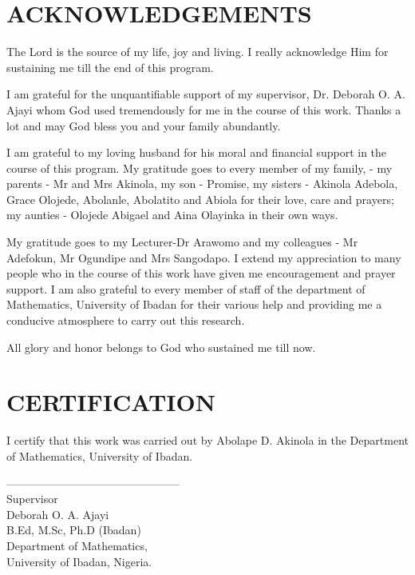 \documentclass[12pt]{report}
\begin{document}
\chapter*{ACKNOWLEDGEMENTS}
 The Lord is the
source of my life, joy and living. I really acknowledge Him for
sustaining me till the end of this program.

I am grateful for the unquantifiable support of my supervisor, Dr.
Deborah O. A. Ajayi whom God used tremendously for me in the course
of this work. Thanks a lot and may God bless you and your family
abundantly.

I am grateful to my loving husband for his moral and financial
support in the course of this program. My gratitude goes to every
member of my family, - my parents - Mr and Mrs Akinola, my son -
Promise, my sisters - Akinola Adebola, Grace Olojede, Abolanle,
Abolatito and Abiola for their love, care and prayers; my aunties -
Olojede Abigael and Aina Olayinka in their own ways.

My gratitude goes to my Lecturer-Dr Arawomo and my colleagues - Mr Adefokun, Mr Ogundipe and
Mrs Sangodapo. I extend my appreciation to many people who in the
course of this work have given me encouragement and prayer support.
I am also grateful to every member of staff of the department of
Mathematics, University of Ibadan for their various help and
providing me a conducive atmosphere to carry out this research.

All glory and honor belongs to God who sustained me till now.

\chapter*{CERTIFICATION}
 I certify that this
 work was carried out by  Abolape D. Akinola
 in the Department of
Mathematics, University of Ibadan. \vspace{1.5in}

\baselineskip 12pt
\begin{center}
-----------------------------------------------\\
Supervisor\\
  Deborah O. A. Ajayi\ \\
B.Ed, M.Sc, Ph.D (Ibadan)\\
 Department of Mathematics,\\
University of Ibadan, Nigeria. \\
\end{center}
\baselineskip 24pt
 \tableofcontents
\newpage
\end{document}
